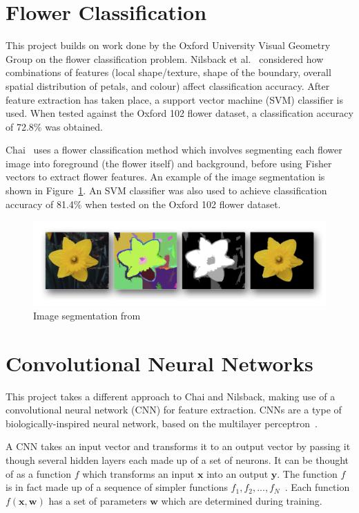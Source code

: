 \documentclass[11pt, a4paper]{report}
\newcommand{\vect}[1]{\boldsymbol{#1}}
\begin{document}
\section{Flower Classification}

This project builds on work done by the Oxford University Visual Geometry Group on the flower classification problem. Nilsback et al.~\cite{Nilsback08} considered how combinations of features (local shape/texture, shape of the boundary, overall spatial distribution of petals, and colour) affect classification accuracy. After feature extraction has taken place, a support vector machine (SVM) classifier is used. When tested against the Oxford 102 flower dataset, a classification accuracy of 72.8\% was obtained.

 Chai~\cite{LitRev:Chai} uses a flower classification method which involves segmenting each flower image into foreground (the flower itself) and background, before using Fisher vectors to extract flower features. An example of the image segmentation is shown in Figure~\ref{img:34}. An SVM classifier was also used to achieve classification accuracy of 81.4\% when tested on the Oxford 102 flower dataset.  
 
\begin{figure}[hbt]
	\centering
  \includegraphics[totalheight=4cm]{img/34.png}
  \caption{Image segmentation from ~\cite{LitRev:Chai}}
  \label{img:34}
\end{figure}
 
\section{Convolutional Neural Networks}


This project takes a different approach to Chai and Nilsback, making use of a convolutional neural network (CNN) for feature extraction. CNNs are a type of biologically-inspired neural network, based on the multilayer perceptron~\cite{LitRev:DeepLearning}.


A CNN takes an input vector and transforms it to an output vector by passing it though several hidden layers each made up of a set of neurons. It can be thought of as a function $f$ which transforms an input $\vect{x}$ into an output $\vect{y}$. The function $f$ is in fact made up of a sequence of simpler functions $f_1, f_2, ..., f_N$~\cite{arXiv:1412.4564}. Each function $f(\vect{x}, \vect{w})$ has a set of parameters $\vect{w}$ which are determined during training. 
\end{document}
